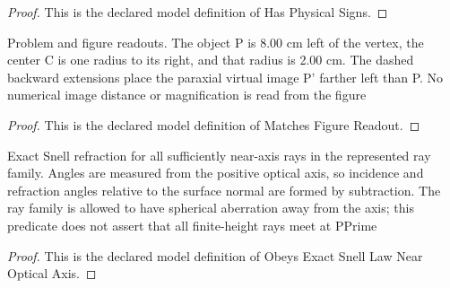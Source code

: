 \begin{proof}
  This is the declared model definition of Has Physical Signs.
\end{proof}
\begin{definition}
  \label{def:physics:phyx-mini-0041:phyxminiproblems-problemphyxmini0041-matchesfigurereadout}
  Problem and figure readouts. The object P is 8.00 cm left of the vertex, the center C is one radius to its right, and that radius is 2.00 cm. The dashed backward extensions place the paraxial virtual image P' farther left than P. No numerical image distance or magnification is read from the figure
\end{definition}
\begin{proof}
  This is the declared model definition of Matches Figure Readout.
\end{proof}
\begin{definition}
  \label{def:physics:phyx-mini-0041:phyxminiproblems-problemphyxmini0041-obeysexactsnelllawnearopticalaxis}
  Exact Snell refraction for all sufficiently near-axis rays in the represented ray family. Angles are measured from the positive optical axis, so incidence and refraction angles relative to the surface normal are formed by subtraction. The ray family is allowed to have spherical aberration away from the axis; this predicate does not assert that all finite-height rays meet at PPrime
\end{definition}
\begin{proof}
  This is the declared model definition of Obeys Exact Snell Law Near Optical Axis.
\end{proof}
